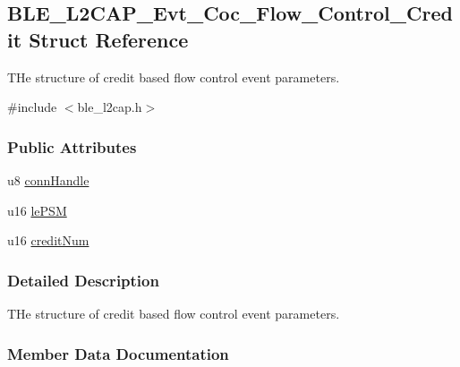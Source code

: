 \hypertarget{struct_b_l_e___l2_c_a_p___evt___coc___flow___control___credit}{}\subsection{B\+L\+E\+\_\+\+L2\+C\+A\+P\+\_\+\+Evt\+\_\+\+Coc\+\_\+\+Flow\+\_\+\+Control\+\_\+\+Credit Struct Reference}
\label{struct_b_l_e___l2_c_a_p___evt___coc___flow___control___credit}


T\+He structure of credit based flow control event parameters.  




{\ttfamily \#include $<$ble\+\_\+l2cap.\+h$>$}

\subsubsection*{Public Attributes}
\begin{DoxyCompactItemize}
\item 
u8 \hyperlink{struct_b_l_e___l2_c_a_p___evt___coc___flow___control___credit_aa290bb033e321b63549b47bf80be1311}{conn\+Handle}
\item 
u16 \hyperlink{struct_b_l_e___l2_c_a_p___evt___coc___flow___control___credit_aa5799b0c8fb7703218eb94ef16c922a6}{le\+P\+SM}
\item 
u16 \hyperlink{struct_b_l_e___l2_c_a_p___evt___coc___flow___control___credit_ab43d71b91146498f464bbe13d648ae96}{credit\+Num}
\end{DoxyCompactItemize}


\subsubsection{Detailed Description}
T\+He structure of credit based flow control event parameters. 

\subsubsection{Member Data Documentation}
